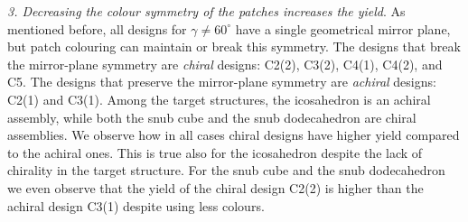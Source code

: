 \documentclass[a4paper, amsfonts, amssymb, amsmath, reprint, showkeys, nofootinbib, oneside]{revtex4-1}
\begin{document}
\noindent
\emph{3. Decreasing the colour symmetry of the patches increases the yield}. As mentioned before, all designs for $\gamma\neq 60^\circ$ have a single geometrical mirror plane, but patch colouring can maintain or break this symmetry. The designs that break the mirror-plane symmetry are \emph{chiral} designs: C2(2), C3(2), C4(1), C4(2), and C5. The designs that preserve the mirror-plane symmetry are \emph{achiral} designs: C2(1) and C3(1). Among the target structures, the icosahedron is an achiral assembly, while both the snub cube and the snub dodecahedron are chiral assemblies. We observe how in all cases chiral designs have higher yield compared to the achiral ones. This is true also for the icosahedron despite the lack of chirality in the target structure. For the snub cube and the snub dodecahedron we even observe that the yield of the chiral design C2(2) is higher than the achiral design C3(1) despite using less colours.




\end{document}
